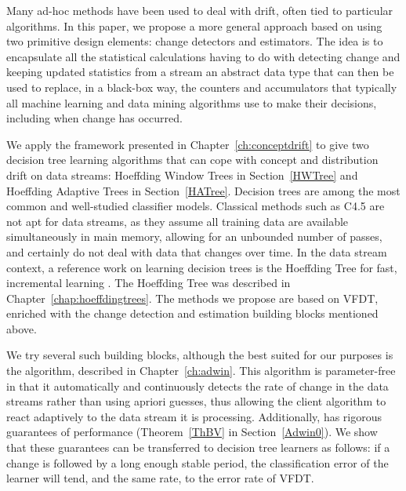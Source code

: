 Many ad-hoc methods have been used to deal with drift, often tied to particular algorithms. 
In this paper, we propose a more general approach based on using two primitive design 
elements: change detectors and estimators. 
The idea is to 
encapsulate all the statistical calculations having to do with detecting change and keeping
updated statistics from a stream an abstract data type that can then be used to replace, 
in a black-box way, the counters and accumulators that typically all machine learning
and data mining algorithms use to make their decisions, including when change has occurred. 
\ENDOMIT

We apply the framework presented in Chapter~\ref{ch:conceptdrift} %
to give two %
decision tree learning algorithms that can cope with concept and distribution drift on data streams: 
Hoeffding Window Trees in Section~\ref{HWTree} and Hoeffding Adaptive Trees in Section~\ref{HATree}.
Decision trees are among the most common and well-studied classifier models. 
Classical methods such as C4.5 are not apt for data streams, as they assume all training
data are available simultaneously in main memory, allowing for an unbounded number of passes,
and certainly do not deal with data that changes over time. 
In the data stream context, a reference work on learning decision trees
is %
the Hoeffding Tree %
for fast, incremental learning \cite{vfdt}. The Hoeffding Tree was
described in Chapter~\ref{chap:hoeffdingtrees}. %
The methods we propose
are based on VFDT, enriched with the change detection and estimation building blocks
mentioned above. 

We try several such building blocks, although the best suited for our purposes
is the \adwin algorithm, described in 
Chapter~\ref{ch:adwin}. This algorithm is parameter-free in that it automatically and continuously detects 
the rate of change in the data streams rather than using apriori guesses, 
thus allowing the client algorithm to react adaptively to the data stream it is processing. 
Additionally, \adwin has rigorous guarantees of performance (Theorem~\ref{ThBV} in Section~\ref{Adwin0}). We show
that these guarantees can be transferred to decision tree learners 
as follows: if a change is followed by a long enough stable period,
the classification error of the learner
will tend, and the same rate, to the error 
rate of VFDT.  


